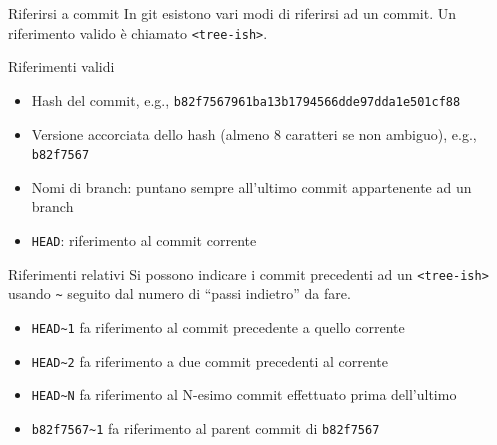 \documentclass[xcolor=dvipsnames,presentation]{beamer}
\begin{document}
\begin{frame}{Riferirsi a commit}
    In git esistono vari modi di riferirsi ad un commit. Un riferimento valido è chiamato \texttt{<tree-ish>}.
    \begin{block}{Riferimenti validi}
        \begin{itemize}
            \item Hash del commit, e.g., \texttt{b82f7567961ba13b1794566dde97dda1e501cf88}
            \item Versione accorciata dello hash (almeno 8 caratteri se non ambiguo), e.g., \texttt{b82f7567}
            \item Nomi di branch: puntano sempre all'ultimo commit appartenente ad un branch
            \item \texttt{HEAD}: riferimento al commit corrente
        \end{itemize}
    \end{block}
    \begin{block}{Riferimenti relativi}
        Si possono indicare i commit precedenti ad un \texttt{<tree-ish>} usando \texttt{\textasciitilde{}} seguito dal numero di ``passi indietro'' da fare.
        \begin{itemize}
            \item \texttt{HEAD\textasciitilde{}1} fa riferimento al commit precedente a quello corrente
            \item \texttt{HEAD\textasciitilde{}2} fa riferimento a due commit precedenti al corrente
            \item \texttt{HEAD\textasciitilde{}N} fa riferimento al N-esimo commit effettuato prima dell'ultimo
            \item \texttt{b82f7567\textasciitilde{}1} fa riferimento al parent commit di \texttt{b82f7567}
        \end{itemize}
    \end{block}
\end{frame}
\end{document}
